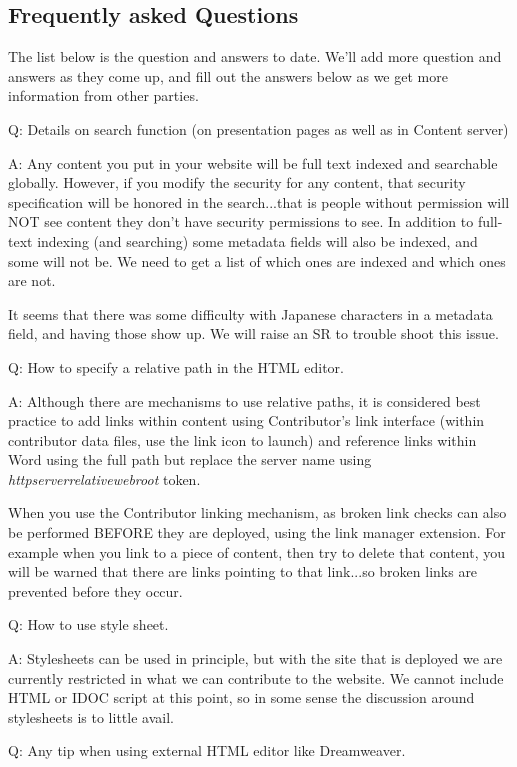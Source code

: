 \subsection{Frequently asked Questions}

The list below is the question and answers to date.  We'll add more
question and answers as they come up, and fill out the answers below
as we get more information from other parties.

Q: Details on search function (on presentation pages as well as in
Content server)

A: Any content you put in your website will be full text indexed and
searchable globally.  However, if you modify the security for any
content, that security specification will be honored in the
search...that is people without permission will NOT see content they
don't have security permissions to see.  In addition to full-text
indexing (and searching) some metadata fields will also be indexed,
and some will not be.  We need to get a list of which ones are indexed
and which ones are not.

It seems that there was some difficulty with Japanese characters in a
metadata field, and having those show up.  We will raise an SR to
trouble shoot this issue.


Q: How to specify a relative path in the HTML editor.

A: Although there are mechanisms to use relative paths, it is
considered best practice to add links within content using
Contributor's link interface (within contributor data files, use the
link icon to launch) and reference links within Word using the full
path but replace the server name using \emph{httpserverrelativewebroot}
token.

When you use the Contributor linking mechanism, as broken link checks
can also be performed BEFORE they are deployed, using the link manager
extension.  For example when you link to a piece of content, then try
to delete that content, you will be warned that there are links
pointing to that link...so broken links are prevented before they
occur.

Q: How to use style sheet.

A: Stylesheets can be used in principle, but with the site that is
deployed we are currently restricted in what we can contribute to the
website.  We cannot include HTML or IDOC script at this point, so in
some sense the discussion around stylesheets is to little avail.


Q: Any tip when using external HTML editor like Dreamweaver.

